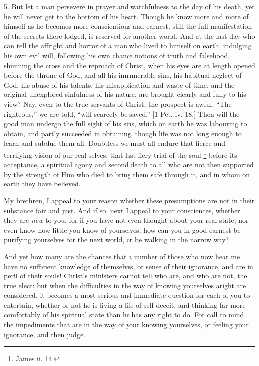 5. But let a man persevere in prayer and watchfulness
to the day of his death, yet he will never get to the
bottom of his heart. Though he know more and more of
himself as he becomes more conscientious and earnest,
still the full manifestation of the secrets there lodged,
is reserved for another world. And at the last day who
can tell the affright and horror of a man who lived to
himself on earth, indulging his own evil will, following
his own chance notions of truth and falsehood, shunning
the cross and the reproach of Christ, when his eyes are
at length opened before the throne of God, and all his
innumerable sins, his habitual neglect of God, his abuse
of his talents, his misapplication and waste of time, and
the original unexplored sinfulness of his nature, are
brought clearly and fully to his view? Nay, even to the
true servants of Christ, the prospect is awful. ``The
righteous,'' we are told, ``will scarcely be
saved.'' [1 Pet. iv. 18.] Then will the good man
undergo the full sight of his sins, which on earth he was
labouring to obtain, and partly succeeded in obtaining,
though life was not long enough to learn and subdue them
all. Doubtless we must all endure that fierce and
terrifying vision of our real selves, that last fiery
trial of the soul \footnote{James ii. 14.} before its
acceptance, a spiritual agony and second death to all who
are not then supported by the strength of Him who died to
bring them safe through it, and in whom on earth they
have believed.

My brethren, I appeal to your reason whether these
presumptions are not in their substance fair and just.
And if so, next I appeal to your consciences, whether
they are \emph{new} to you; for if you have not even
thought about your real state, nor even know how little
you know of yourselves, how can you in good earnest be
purifying yourselves for the next world, or be walking in
the narrow way?

And yet how many are the chances that a number of
those who now hear me have no sufficient knowledge of
themselves, or sense of their ignorance, and are in peril
of their souls! Christ's ministers cannot tell who are,
and who are not, the true elect: but when the
difficulties in the way of knowing yourselves aright are
considered, it becomes a most serious and immediate
question for each of you to entertain, whether or not he
is living a life of self-deceit, and thinking far more
comfortably of his spiritual state than he has any right
to do. For call to mind the impediments that are in the
way of your knowing yourselves, or feeling your
ignorance, and then judge.

